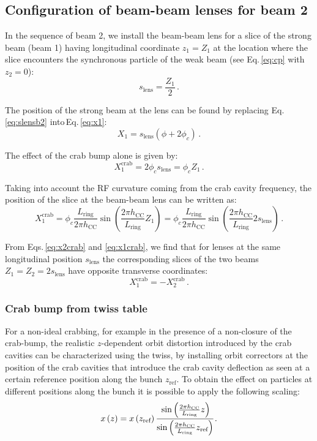 \subsection{Configuration of beam-beam lenses for beam 2}
In the sequence of beam 2, we install the beam-beam lens for a slice of the strong beam (beam 1) having longitudinal coordinate $z_1=Z_1$ at the location where the slice encounters the synchronous particle of the weak beam (see Eq.\,\eqref{eq:cp} with $z_2 = 0$):
\begin{equation}
    s_\text{lens} = \frac{Z_1}{2}
    \, .
    \label{eq:slensb2}
\end{equation}

The position of the strong beam at the lens can be found by replacing Eq.\,\eqref{eq:slensb2} into\,Eq.\,\eqref{eq:x1}:
\begin{equation}
   X_1 = s_\text{lens} (\phi + 2 \phi_c)
   \, .
\end{equation}

The effect of the crab bump alone is given by:
\begin{equation}
   X^\text{crab}_1 = 2 \phi_c s_\text{lens} = \phi_c Z_1
   \, .
\end{equation}

Taking into account the RF curvature coming from the crab cavity frequency, the position of the slice at the beam-beam lens can be written as:
\begin{equation}
   X^\text{crab}_1 = \phi_c \frac{L_\text{ring}}{2 \pi h_\text{CC}} \sin\left(  \frac{2 \pi h_\text{CC}}{L_\text{ring}} Z_1\right) = \phi_c \frac{L_\text{ring}}{2 \pi h_\text{CC}} \sin\left(  \frac{2 \pi h_\text{CC}}{L_\text{ring}} 2 s_\text{lens}\right)
   \, .
   \label{eq:x1crab}
\end{equation}

From Eqs.\,\eqref{eq:x2crab} and \eqref{eq:x1crab}, we find that for lenses at the same longitudinal position $s_\text{lens}$ the corresponding slices of the two beams $Z_1 = Z_2 = 2 s_\text{lens}$ have opposite transverse coordinates:
\begin{equation}
X^\text{crab}_1= -X^\text{crab}_2
\, .
\end{equation}

\subsubsection{Crab bump from twiss table}

For a non-ideal crabbing, for example in the presence of a non-closure of the crab-bump, the realistic $z$-dependent  orbit distortion introduced by the crab cavities can be characterized using the twiss, by installing orbit correctors at the position of the crab cavities that introduce the crab cavity deflection as seen at a certain reference position along the bunch $z_\text{ref}$. 
To obtain the effect on particles at different positions along the bunch it is possible to apply the following scaling:
\begin{equation}
x\left(z\right) = x\left(z_\text{ref}\right)
 \cfrac
 {\sin\left(  \frac{2 \pi h_\text{CC}}{L_\text{ring}} z\right)}
 {\sin\left(  \frac{2 \pi h_\text{CC}}{L_\text{ring}} z_\text{ref}\right)} 
 \, .
\end{equation}

